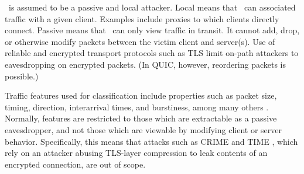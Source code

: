 \documentclass[runningheads]{llncs}
\begin{document}
\adv\ is assumed to be a passive and local attacker. Local means that \adv\ can associated 
traffic with a given client. Examples include proxies to which clients directly connect. 
Passive means that \adv\ can only view traffic in transit. It cannot add, drop, or otherwise
modify packets between the victim client and server(s). Use of reliable and encrypted transport
protocols such as TLS limit on-path attackers to eavesdropping on encrypted packets. (In
QUIC, however, reordering packets is possible.)

Traffic features used for classification include properties such as packet size, timing, 
direction, interarrival times, and burstiness, among many others \cite{wang2016website}. Normally, features
are restricted to those which are extractable as a passive eavesdropper, and not those which 
are viewable by modifying client or server behavior. Specifically, this means that
attacks such as CRIME \cite{} and TIME \cite{}, which rely on an attacker abusing TLS-layer compression
to leak contents of an encrypted connection, are out of scope. 
\end{document}
